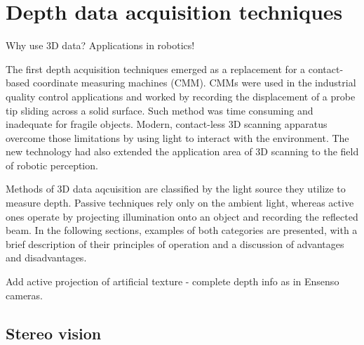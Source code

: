 \chapter{Depth data acquisition techniques}
\label{cha:acquisition}

Why use 3D data? Applications in robotics!

The first depth acquisition techniques emerged as a replacement for a contact-based coordinate measuring machines (CMM). CMMs were used in the industrial quality control applications and worked by recording the displacement of a probe tip sliding across a solid surface. Such method was time consuming and inadequate for fragile objects. Modern, contact-less 3D scanning apparatus overcome those limitations by using light to interact with the environment. The new technology had also extended the application area of 3D scanning to the field of robotic perception.

Methods of 3D data aqcuisition are classified by the light source they utilize to measure depth. Passive techniques rely only on the ambient light, whereas active ones operate by projecting illumination onto an object and recording the reflected beam. In the following sections, examples of both categories are presented, with a brief description of their principles of operation and a discussion of advantages and disadvantages.

Add active projection of artificial texture - complete depth info as in Ensenso cameras.


\section{Stereo vision}
\label{sec:stereo}

